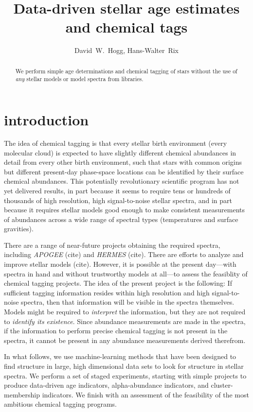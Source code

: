 \documentclass[12pt, preprint]{aastex}
\newcommand{\project}[1]{\textsl{#1}}
\begin{document}
\title{Data-driven stellar age estimates and chemical tags}
\author{
  David~W.~Hogg,
  Hans-Walter~Rix
}

\begin{abstract}
We perform simple age determinations and chemical tagging of stars
without the use of \emph{any} stellar models or model spectra from
libraries.
\end{abstract}

\section{introduction}

The idea of chemical tagging is that every stellar birth environment
(every molecular cloud) is expected to have slightly different
chemical abundances in detail from every other birth environment, such
that stars with common origins but different present-day phase-space
locations can be identified by their surface chemical abundances.
This potentially revolutionary scientific program has not yet
delivered results, in part because it seems to require tens or
hundreds of thousands of high resolution, high signal-to-noise stellar
spectra, and in part because it requires stellar models good enough to
make consistent measurements of abundances across a wide range of
spectral types (temperatures and surface gravities).

There are a range of near-future projects obtaining the required
spectra, including \project{APOGEE} (cite) and \project{HERMES}
(cite).  There are efforts to analyze and improve stellar models
(cite).  However, it is possible at the present day---with spectra in
hand and without trustworthy models at all---to assess the feasiblity
of chemical tagging projects.  The idea of the present project is the
following: If sufficient tagging information resides within high
resolution and high signal-to-noise spectra, then that information
will be visible in the spectra themselves.  Models might be required
to \emph{interpret} the information, but they are not required to
\emph{identify its existence}.  Since abundance measurements are made
in the spectra, if the information to perform precise chemical tagging
is not present in the spectra, it cannot be present in any abundance
measurements derived therefrom.

In what follows, we use machine-learning methods that have been
designed to find structure in large, high dimensional data sets to
look for structure in stellar spectra.  We perform a set of staged
experiments, starting with simple projects to produce data-driven age
indicators, alpha-abundance indicators, and cluster-membership
indicators.  We finish with an assessment of the feasibility of the
most ambitious chemical tagging programs.
\end{document}
